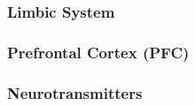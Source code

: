 
\subsubsection{Limbic System}

\subsubsection{Prefrontal Cortex (PFC)}


\subsubsection{Neurotransmitters}

